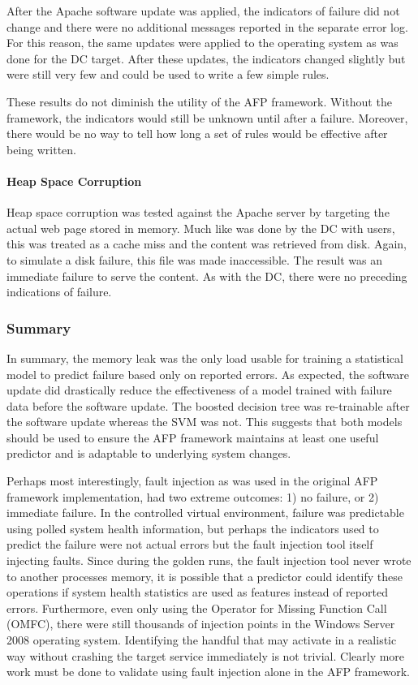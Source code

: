 After the Apache software update was applied, the indicators of failure did not
change and there were no additional messages reported in the separate error
log.  For this reason, the same updates were applied to the operating system as
was done for the \ac{DC} target.  After these updates, the indicators changed
slightly but were still very few and could be used to write a few simple rules.

These results do not diminish the utility of the \ac{AFP} framework.  Without
the framework, the indicators would still be unknown until after a failure.
Moreover, there would be no way to tell how long a set of rules would be
effective after being written.

\paragraph{Heap Space Corruption}
Heap space corruption was tested against the Apache server by targeting the
actual web page stored in memory.  Much like was done by the \ac{DC} with
users, this was treated as a cache miss and the content was retrieved from
disk.  Again, to simulate a disk failure, this file was made inaccessible.  The
result was an immediate failure to serve the content.  As with the \ac{DC},
there were no preceding indications of failure.

\subsubsection{Summary}
In summary, the memory leak was the only load usable for training a statistical
model to predict failure based only on reported errors.  As expected, the
software update did drastically reduce the effectiveness of a model trained
with failure data before the software update.  The boosted decision tree was
re-trainable after the software update whereas the \ac{SVM} was not.  This
suggests that both models should be used to ensure the \ac{AFP} framework
maintains at least one useful predictor and is adaptable to underlying system
changes.

Perhaps most interestingly, fault injection as was used in the original
\ac{AFP} framework implementation, had two extreme outcomes: 1) no failure, or
2) immediate failure.  In the controlled virtual environment, failure was
predictable using polled system health information, but perhaps the indicators
used to predict the failure were not actual errors but the fault injection tool
itself injecting faults.  Since during the golden runs, the fault injection
tool never wrote to another processes memory, it is possible that a predictor
could identify these operations if system health statistics are used as
features instead of reported errors.  Furthermore, even only using the Operator
for Missing Function Call (OMFC), there were still thousands of injection
points in the Windows Server 2008 operating system.  Identifying the handful
that may activate in a realistic way without crashing the target service
immediately is not trivial.  Clearly more work must be done to validate using
fault injection alone in the \ac{AFP} framework.

